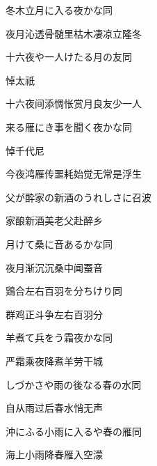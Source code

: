 \begin{haiku}
    {\FH 冬木立月に入る夜かな}\hfill{\FH 同}

    {\FK 夜月沁透骨髄里枯木凄凉立隆冬}
\end{haiku}

\begin{haiku}
    {\FH 十六夜や一人けたる月の友}\hfill{\FH 同}

    {\FK 悼太祇}

    {\FK 十六夜间添惆怅赏月良友少一人}
\end{haiku}

\begin{haiku}
    {\FH 来る雁にき事を聞く夜かな}\hfill{\FH 同}

    {\FK 悼千代尼}

    {\FK 今夜鸿雁传噩耗始觉无常是浮生}
\end{haiku}

\begin{haiku}
    {\FH 父が酔家の新酒のうれしさに}\hfill{\FH 召波}

    {\FK 家酿新酒美老父赴醉乡}
\end{haiku}

\begin{haiku}
    {\FH 月けて桑に音あるかな}\hfill{\FH 同}

    {\FK 夜月渐沉沉桑中闻蚕音}
\end{haiku}

\begin{haiku}
    {\FH 鶏合左右百羽を分ちけり}\hfill{\FH 同}

    {\FK 群鸡正斗争左右百羽分}
\end{haiku}

\begin{haiku}
    {\FH 羊煮て兵をう霜夜かな}\hfill{\FH 同}

    {\FK 严霜乘夜降煮羊劳干城}
\end{haiku}

\begin{haiku}
    {\FH しづかさや雨の後なる春の水}\hfill{\FH 同}

    {\FK 自从雨过后春水悄无声}
\end{haiku}

\begin{haiku}
    {\FH 沖にふる小雨に入るや春の雁}\hfill{\FH 同}

    {\FK 海上小雨降春雁入空濛}
\end{haiku}

